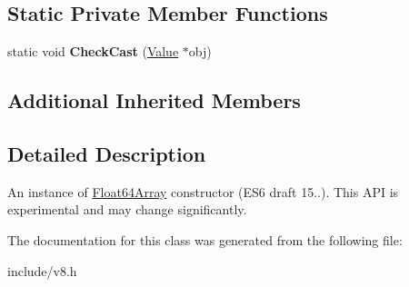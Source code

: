 \subsection*{Static Private Member Functions}
\begin{DoxyCompactItemize}
\item 
static void {\bfseries Check\+Cast} (\hyperlink{classv8_1_1_value}{Value} $\ast$obj)\hypertarget{classv8_1_1_float64_array_af351dcd287535555bca435b201ef60be}{}\label{classv8_1_1_float64_array_af351dcd287535555bca435b201ef60be}

\end{DoxyCompactItemize}
\subsection*{Additional Inherited Members}


\subsection{Detailed Description}
An instance of \hyperlink{classv8_1_1_float64_array}{Float64\+Array} constructor (E\+S6 draft 15..). This A\+PI is experimental and may change significantly. 

The documentation for this class was generated from the following file\+:\begin{DoxyCompactItemize}
\item 
include/v8.\+h\end{DoxyCompactItemize}
